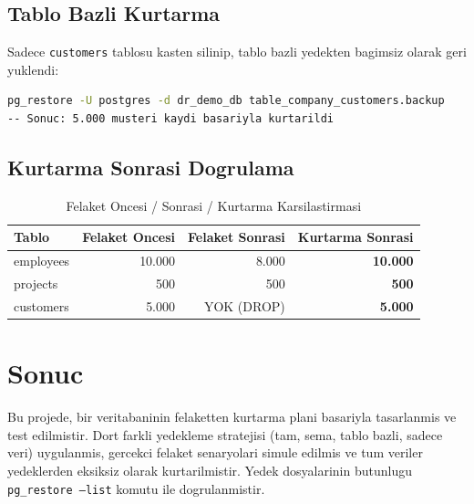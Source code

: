 \documentclass[12pt,a4paper]{article}
\begin{document}
\subsection{Tablo Bazli Kurtarma}
Sadece \texttt{customers} tablosu kasten silinip, tablo bazli yedekten bagimsiz olarak geri yuklendi:
\begin{lstlisting}[language=bash, caption=Tablo Bazli Restore]
pg_restore -U postgres -d dr_demo_db table_company_customers.backup
-- Sonuc: 5.000 musteri kaydi basariyla kurtarildi
\end{lstlisting}

\subsection{Kurtarma Sonrasi Dogrulama}
\begin{table}[h]
\centering
\begin{tabular}{|l|r|r|r|}
\hline
\textbf{Tablo} & \textbf{Felaket Oncesi} & \textbf{Felaket Sonrasi} & \textbf{Kurtarma Sonrasi} \\
\hline
employees & 10.000 & 8.000 & \textbf{10.000} \\
projects & 500 & 500 & \textbf{500} \\
customers & 5.000 & YOK (DROP) & \textbf{5.000} \\
\hline
\end{tabular}
\caption{Felaket Oncesi / Sonrasi / Kurtarma Karsilastirmasi}
\end{table}

\section{Sonuc}
Bu projede, bir veritabaninin felaketten kurtarma plani basariyla tasarlanmis ve test edilmistir. Dort farkli yedekleme stratejisi (tam, sema, tablo bazli, sadece veri) uygulanmis, gercekci felaket senaryolari simule edilmis ve tum veriler yedeklerden eksiksiz olarak kurtarilmistir. Yedek dosyalarinin butunlugu \texttt{pg\_restore --list} komutu ile dogrulanmistir.
\end{document}
